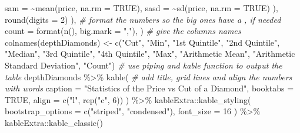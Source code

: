 \documentclass[
]{article}
\newenvironment{Shaded}{\begin{snugshade}}{\end{snugshade}}
\newcommand{\AttributeTok}[1]{\textcolor[rgb]{0.77,0.63,0.00}{#1}}
\newcommand{\CommentTok}[1]{\textcolor[rgb]{0.56,0.35,0.01}{\textit{#1}}}
\newcommand{\ConstantTok}[1]{\textcolor[rgb]{0.00,0.00,0.00}{#1}}
\newcommand{\DecValTok}[1]{\textcolor[rgb]{0.00,0.00,0.81}{#1}}
\newcommand{\FunctionTok}[1]{\textcolor[rgb]{0.00,0.00,0.00}{#1}}
\newcommand{\NormalTok}[1]{#1}
\newcommand{\OtherTok}[1]{\textcolor[rgb]{0.56,0.35,0.01}{#1}}
\newcommand{\SpecialCharTok}[1]{\textcolor[rgb]{0.00,0.00,0.00}{#1}}
\newcommand{\StringTok}[1]{\textcolor[rgb]{0.31,0.60,0.02}{#1}}
\begin{document}
\begin{Shaded}
\begin{Highlighting}[]
        \AttributeTok{sam =} \SpecialCharTok{\textasciitilde{}}\FunctionTok{mean}\NormalTok{(price, }\AttributeTok{na.rm =} \ConstantTok{TRUE}\NormalTok{),}
        \AttributeTok{sasd =} \SpecialCharTok{\textasciitilde{}}\FunctionTok{sd}\NormalTok{(price, }\AttributeTok{na.rm =} \ConstantTok{TRUE}\NormalTok{)}
\NormalTok{      ),}
      \FunctionTok{round}\NormalTok{(}\AttributeTok{digits =} \DecValTok{2}\NormalTok{)}
\NormalTok{    ),}
    \CommentTok{\# format the numbers so the big ones have a , if needed}
    \AttributeTok{count =} \FunctionTok{format}\NormalTok{(}\FunctionTok{n}\NormalTok{(), }\AttributeTok{big.mark =} \StringTok{","}\NormalTok{),}
\NormalTok{  )}
\CommentTok{\# give the columns names}
\FunctionTok{colnames}\NormalTok{(depthDiamonds) }\OtherTok{\textless{}{-}} \FunctionTok{c}\NormalTok{(}\StringTok{"Cut"}\NormalTok{, }\StringTok{"Min"}\NormalTok{, }\StringTok{"1st Quintile"}\NormalTok{, }\StringTok{"2nd Quintile"}\NormalTok{, }\StringTok{"Median"}\NormalTok{, }\StringTok{"3rd Quintile"}\NormalTok{, }\StringTok{"4th Quintile"}\NormalTok{, }\StringTok{"Max"}\NormalTok{, }\StringTok{"Arithmetic Mean"}\NormalTok{, }\StringTok{"Arithmetic Standard Deviation"}\NormalTok{, }\StringTok{"Count"}\NormalTok{)}
\CommentTok{\# use piping and kable function to output the table}
\NormalTok{depthDiamonds }\SpecialCharTok{\%\textgreater{}\%}
  \FunctionTok{kable}\NormalTok{(}
    \CommentTok{\# add title, grid lines and align the numbers with words}
    \AttributeTok{caption =} \StringTok{"Statistics of the Price vs Cut of a Diamond"}\NormalTok{,}
    \AttributeTok{booktabs =} \ConstantTok{TRUE}\NormalTok{,}
    \AttributeTok{align =} \FunctionTok{c}\NormalTok{(}\StringTok{"l"}\NormalTok{, }\FunctionTok{rep}\NormalTok{(}\StringTok{"c"}\NormalTok{, }\DecValTok{6}\NormalTok{))}
\NormalTok{  ) }\SpecialCharTok{\%\textgreater{}\%}
\NormalTok{  kableExtra}\SpecialCharTok{::}\FunctionTok{kable\_styling}\NormalTok{(}
    \AttributeTok{bootstrap\_options =} \FunctionTok{c}\NormalTok{(}\StringTok{"striped"}\NormalTok{, }\StringTok{"condensed"}\NormalTok{),}
    \AttributeTok{font\_size =} \DecValTok{16}
\NormalTok{  ) }\SpecialCharTok{\%\textgreater{}\%}
\NormalTok{  kableExtra}\SpecialCharTok{::}\FunctionTok{kable\_classic}\NormalTok{()}
\end{Highlighting}
\end{Shaded}
\end{document}
